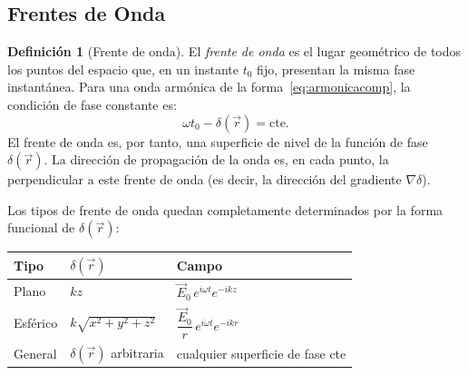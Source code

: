 \documentclass[12pt, a4paper]{article}
\theoremstyle{plain}
\theoremstyle{definition}
\newtheorem{definicion}[teorema]{Definición}
\theoremstyle{remark}
\newcommand{\ve}[1]{\vec{#1}}
\begin{document}
\subsection{Frentes de Onda}

\begin{definicion}[Frente de onda]
El \emph{frente de onda} es el lugar geométrico de todos los puntos del espacio
que, en un instante $t_0$ fijo, presentan la misma fase instantánea. Para una
onda armónica de la forma~\eqref{eq:armonicacomp}, la condición de fase constante
es:
\begin{equation}
  \omega t_0 - \delta(\ve{r}) = \mathrm{cte}. \label{eq:frente}
\end{equation}
El frente de onda es, por tanto, una superficie de nivel de la función de fase
$\delta(\ve{r})$. La dirección de propagación de la onda es, en cada punto, la
perpendicular a este frente de onda (es decir, la dirección del gradiente
$\nabla\delta$).
\end{definicion}

Los tipos de frente de onda quedan completamente determinados por la forma
funcional de $\delta(\ve{r})$:

\medskip
\begin{center}
\begin{tabularx}{0.95\linewidth}{@{}L{2.1cm}Y Y@{}}
  \toprule
  Tipo & $\delta(\ve{r})$ & Campo \\
  \midrule
  Plano    & $kz$                     & $\ve{E}_0\,e^{i\omega t}e^{-ikz}$ \\
  Esférico & $k\sqrt{x^2+y^2+z^2}$   & $\dfrac{\ve{E}_0}{r}\,e^{i\omega t}e^{-ikr}$ \\
  General  & $\delta(\ve{r})$ arbitraria & cualquier superficie de fase cte \\
  \bottomrule
\end{tabularx}
\end{center}
\end{document}
